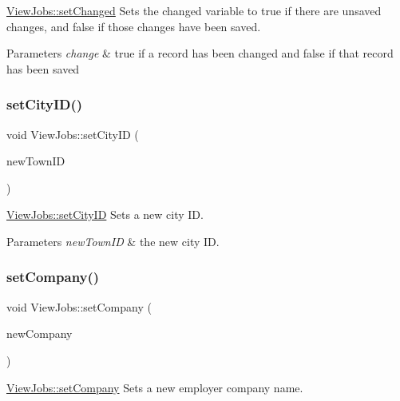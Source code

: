 \mbox{\hyperlink{class_view_jobs_a3cba868c6deadaf4b35c18982f7ec35e}{View\+Jobs\+::set\+Changed}} Sets the changed variable to true if there are unsaved changes, and false if those changes have been saved. 


\begin{DoxyParams}{Parameters}
{\em change} & true if a record has been changed and false if that record has been saved \\
\hline
\end{DoxyParams}
\mbox{\label{class_view_jobs_ad89218b37af85cac9ce6c346efb57e56}} 
\subsubsection{\texorpdfstring{set\+City\+I\+D()}{setCityID()}}
{\footnotesize\ttfamily void View\+Jobs\+::set\+City\+ID (\begin{DoxyParamCaption}\item[{int}]{new\+Town\+ID }\end{DoxyParamCaption})}



\mbox{\hyperlink{class_view_jobs_ad89218b37af85cac9ce6c346efb57e56}{View\+Jobs\+::set\+City\+ID}} Sets a new city ID. 


\begin{DoxyParams}{Parameters}
{\em new\+Town\+ID} & the new city ID. \\
\hline
\end{DoxyParams}
\mbox{\label{class_view_jobs_a596246d07be66a5aeaf14ff8e5649290}} 
\subsubsection{\texorpdfstring{set\+Company()}{setCompany()}}
{\footnotesize\ttfamily void View\+Jobs\+::set\+Company (\begin{DoxyParamCaption}\item[{Q\+String}]{new\+Company }\end{DoxyParamCaption})}



\mbox{\hyperlink{class_view_jobs_a596246d07be66a5aeaf14ff8e5649290}{View\+Jobs\+::set\+Company}} Sets a new employer company name. 


